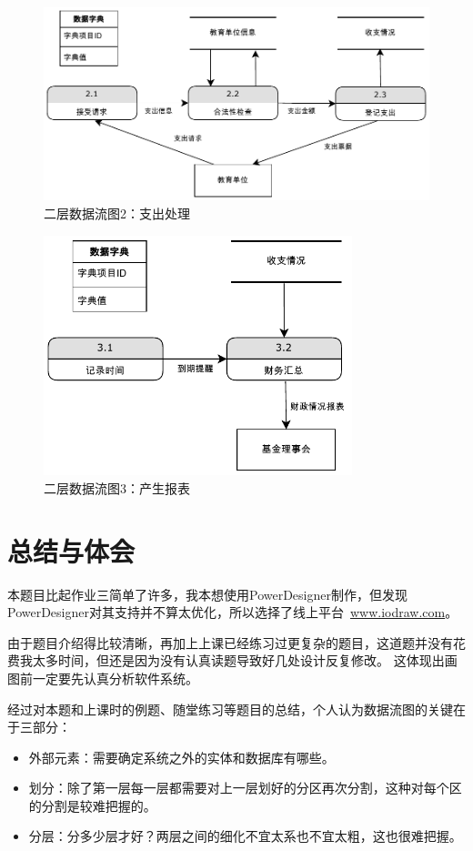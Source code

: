 \documentclass[12pt, a4paper, oneside]{ctexart}
\begin{document}
\begin{figure}[H]
    \centering
    \includegraphics[width = 1\textwidth]{../pic/二级2.pdf}
    \caption{二层数据流图2：支出处理}
\end{figure}

\begin{figure}[H]
    \centering
    \includegraphics[width = 0.8\textwidth]{../pic/二级3.pdf}
    \caption{二层数据流图3：产生报表}
\end{figure}

\section{总结与体会}

本题目比起作业三简单了许多，我本想使用PowerDesigner制作，但发现PowerDesigner对其支持并不算太优化，所以选择了线上平台~\url{www.iodraw.com}。

由于题目介绍得比较清晰，再加上上课已经练习过更复杂的题目，这道题并没有花费我太多时间，但还是因为没有认真读题导致好几处设计反复修改。
这体现出画图前一定要先认真分析软件系统。

经过对本题和上课时的例题、随堂练习等题目的总结，个人认为数据流图的关键在于三部分：
\begin{itemize}
    \item 外部元素：需要确定系统之外的实体和数据库有哪些。
    \item 划分：除了第一层每一层都需要对上一层划好的分区再次分割，这种对每个区的分割是较难把握的。
    \item 分层：分多少层才好？两层之间的细化不宜太系也不宜太粗，这也很难把握。
\end{itemize}
\end{document}
